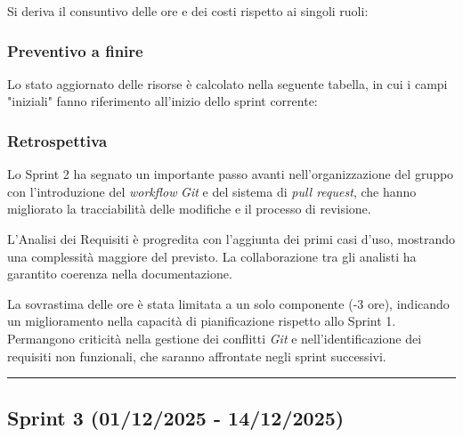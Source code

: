 \documentclass[10pt, letterpaper]{article}
\begin{document}

Si deriva il consuntivo delle ore e dei costi rispetto ai singoli ruoli:

\subsubsection{Preventivo a finire}
Lo stato aggiornato delle risorse è calcolato nella seguente tabella, in cui i campi "iniziali" fanno riferimento all'inizio dello sprint corrente:


\subsubsection{Retrospettiva}
Lo Sprint 2 ha segnato un importante passo avanti nell'organizzazione del gruppo con l'introduzione del \textit{workflow} \textit{Git} e del sistema di \textit{pull request}, che hanno migliorato la tracciabilità delle modifiche e il processo di revisione.

L'Analisi dei Requisiti è progredita con l'aggiunta dei primi casi d'uso, mostrando una complessità maggiore del previsto. La collaborazione tra gli analisti ha garantito coerenza nella documentazione.

La sovrastima delle ore è stata limitata a un solo componente (-3 ore), indicando un miglioramento nella capacità di pianificazione rispetto allo Sprint 1. Permangono criticità nella gestione dei conflitti \textit{Git} e nell'identificazione dei requisiti non funzionali, che saranno affrontate negli sprint successivi.


\vspace{1em}
\hrule
\vspace{1em}

\subsection{Sprint 3 (01/12/2025 - 14/12/2025)}
\end{document}
